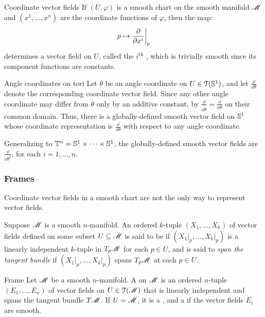
\begin{example}{Coordinate vector fields}{}
  If $ (U,\varphi) $ is a smooth chart on the smooth manifold $ \mathscr{M} $ and $ (x^1 , \dots , x^n) $ are the coordinate functions of $ \varphi $, then the map:
  \begin{equation*}
    p \mapsto \frac{\partial}{\partial x^i} \bigg\vert_p
  \end{equation*}
  determines a vector field on $ U $, called the $ i^\text{th} $ , which is trivially smooth since its component functions are constants.
\end{example}

\begin{example}{Angle coordinates on tori}{}
  Let $ \theta $ be an angle coordinate on $ U \in \EuScript{T}(\mathbb{S}^{1}) $, and let $ \frac{\dd}{\dd \theta} $ denote the corresponding coordinate vector field. Since any other angle coordinate may differ from $ \theta $ only by an additive constant, by  $ \frac{\dd}{\dd \tilde{\theta}} = \frac{\dd}{\dd \theta} $ on their common domain. Thus, there is a globally-defined smooth vector field on $ \mathbb{S}^{1} $ whose coordinate representation is $ \frac{\dd}{\dd \theta} $ with respect to any angle coordinate.

  Generalizing to $ \mathbb{T}^{n} = \mathbb{S}^{1} \times \dots \times \mathbb{S}^{1} $, the globally-defined smooth vector fields are $ \frac{\dd}{\dd \theta^i} $, for each $ i = 1 , \dots , n $.
\end{example}

\subsubsection{Frames}

Coordinate vector fields in a smooth chart are not the only way to represent vector fields.

Suppose $ \mathscr{M} $ is a smooth $ n $-manifold. An ordered $ k $-tuple $ (X_1 , \dots , X_k) $ of vector fields defined on some subset $ U \subseteq \mathscr{M} $ is said to be  if $ (X_1 \vert_p , \dots , X_k \vert_p) $ is a linearly independent $ k $-tuple in $ T_p\mathscr{M} $ for each $ p \in U $, and is said to \emph{span the tangent bundle} if $ (X_1 \vert_p , \dots , X_k \vert_p) $ spans $ T_p\mathscr{M} $ at each $ p \in U $.

\begin{definition}{Frame}{}
  Let $ \mathscr{M} $ be a smooth $ n $-manifold. A  on $ \mathscr{M} $ is an ordered $ n $-tuple $ (E_1 , \dots , E_n) $ of vector fields on $ U \in \EuScript{T}(\mathscr{M}) $ that is linearly independent and spans the tangent bundle $ T\mathscr{M} $. If $ U = \mathscr{M} $, it is a , and a  if the vector fields $ E_i $ are smooth.
\end{definition}

